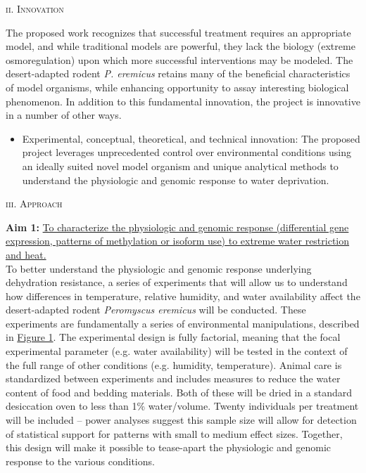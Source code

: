 \documentclass[11pt]{article}
\begin{document}
\normalsize 
\begin{center}
\textsc{{ii. Innovation}} \\
\end{center}

The proposed work recognizes that successful treatment requires an appropriate model, and while traditional models are powerful, they lack the biology (extreme osmoregulation) upon which more successful interventions may be modeled. The desert-adapted rodent \textit{P. eremicus} retains many of the beneficial characteristics of model organisms, while enhancing opportunity to assay interesting biological phenomenon. In addition to this fundamental innovation, the project is innovative in a number of other ways.
\begin{itemize}
\item Experimental, conceptual, theoretical, and technical innovation: The proposed project leverages unprecedented control over environmental conditions using an ideally suited novel model organism and unique analytical methods to understand the physiologic and genomic response to water deprivation.

\end{itemize}

 

\newpage

\linespread{1.1}

\normalsize 
\begin{center}
\textsc{{iii. Approach}} \\
\end{center}

\noindent \textbf{Aim 1:} \ul{To characterize the physiologic and genomic response (differential gene expression, patterns of methylation or isoform use) to extreme water restriction and heat.} \\

To better understand the physiologic and genomic response underlying dehydration resistance, a series of experiments that will allow us to understand how differences in temperature, relative humidity, and water availability affect the desert-adapted rodent \textit{Peromyscus eremicus} will be conducted. These experiments are fundamentally a series of environmental manipulations, described in \hyperlink{Figure 1}{Figure 1}. The experimental design is fully factorial, meaning that the focal experimental parameter (e.g. water availability) will be tested in the context of the full range of other conditions (e.g. humidity, temperature). Animal care is standardized between experiments and includes measures to reduce the water content of food and bedding materials. Both of these will be dried in a standard desiccation oven to less than 1\% water/volume. Twenty individuals per treatment will be included -- power analyses suggest this sample size will allow for detection of statistical support for patterns with small to medium effect sizes. Together, this design will make it possible to tease-apart the physiologic and genomic response to the various conditions. \\
\end{document}
